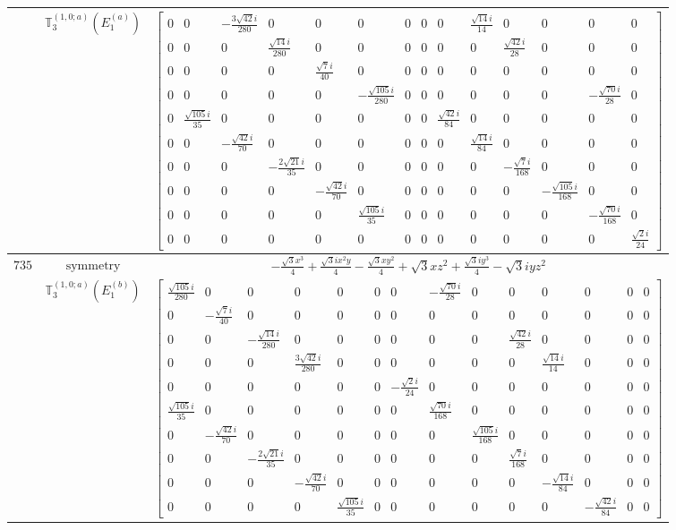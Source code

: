 \documentclass[fleqn,8pt,landscape]{jsarticle}
\begin{document}
\begin{longtable}{ccc}
$  $ & $ \mathbb{T}_{3}^{(1,0;a)}(E_{1}^{(a)}) $ & $ \begin{bmatrix} 0 & 0 & - \frac{3 \sqrt{42} i}{280} & 0 & 0 & 0 & 0 & 0 & 0 & \frac{\sqrt{14} i}{14} & 0 & 0 & 0 & 0 \\ 0 & 0 & 0 & \frac{\sqrt{14} i}{280} & 0 & 0 & 0 & 0 & 0 & 0 & \frac{\sqrt{42} i}{28} & 0 & 0 & 0 \\ 0 & 0 & 0 & 0 & \frac{\sqrt{7} i}{40} & 0 & 0 & 0 & 0 & 0 & 0 & 0 & 0 & 0 \\ 0 & 0 & 0 & 0 & 0 & - \frac{\sqrt{105} i}{280} & 0 & 0 & 0 & 0 & 0 & 0 & - \frac{\sqrt{70} i}{28} & 0 \\ 0 & \frac{\sqrt{105} i}{35} & 0 & 0 & 0 & 0 & 0 & 0 & \frac{\sqrt{42} i}{84} & 0 & 0 & 0 & 0 & 0 \\ 0 & 0 & - \frac{\sqrt{42} i}{70} & 0 & 0 & 0 & 0 & 0 & 0 & \frac{\sqrt{14} i}{84} & 0 & 0 & 0 & 0 \\ 0 & 0 & 0 & - \frac{2 \sqrt{21} i}{35} & 0 & 0 & 0 & 0 & 0 & 0 & - \frac{\sqrt{7} i}{168} & 0 & 0 & 0 \\ 0 & 0 & 0 & 0 & - \frac{\sqrt{42} i}{70} & 0 & 0 & 0 & 0 & 0 & 0 & - \frac{\sqrt{105} i}{168} & 0 & 0 \\ 0 & 0 & 0 & 0 & 0 & \frac{\sqrt{105} i}{35} & 0 & 0 & 0 & 0 & 0 & 0 & - \frac{\sqrt{70} i}{168} & 0 \\ 0 & 0 & 0 & 0 & 0 & 0 & 0 & 0 & 0 & 0 & 0 & 0 & 0 & \frac{\sqrt{2} i}{24} \end{bmatrix} $ \\ \hline
$ 735 $ & $ \text{symmetry} $ & $ - \frac{\sqrt{3} x^{3}}{4} + \frac{\sqrt{3} i x^{2} y}{4} - \frac{\sqrt{3} x y^{2}}{4} + \sqrt{3} x z^{2} + \frac{\sqrt{3} i y^{3}}{4} - \sqrt{3} i y z^{2} $ \\
$  $ & $ \mathbb{T}_{3}^{(1,0;a)}(E_{1}^{(b)}) $ & $ \begin{bmatrix} \frac{\sqrt{105} i}{280} & 0 & 0 & 0 & 0 & 0 & 0 & - \frac{\sqrt{70} i}{28} & 0 & 0 & 0 & 0 & 0 & 0 \\ 0 & - \frac{\sqrt{7} i}{40} & 0 & 0 & 0 & 0 & 0 & 0 & 0 & 0 & 0 & 0 & 0 & 0 \\ 0 & 0 & - \frac{\sqrt{14} i}{280} & 0 & 0 & 0 & 0 & 0 & 0 & \frac{\sqrt{42} i}{28} & 0 & 0 & 0 & 0 \\ 0 & 0 & 0 & \frac{3 \sqrt{42} i}{280} & 0 & 0 & 0 & 0 & 0 & 0 & \frac{\sqrt{14} i}{14} & 0 & 0 & 0 \\ 0 & 0 & 0 & 0 & 0 & 0 & - \frac{\sqrt{2} i}{24} & 0 & 0 & 0 & 0 & 0 & 0 & 0 \\ \frac{\sqrt{105} i}{35} & 0 & 0 & 0 & 0 & 0 & 0 & \frac{\sqrt{70} i}{168} & 0 & 0 & 0 & 0 & 0 & 0 \\ 0 & - \frac{\sqrt{42} i}{70} & 0 & 0 & 0 & 0 & 0 & 0 & \frac{\sqrt{105} i}{168} & 0 & 0 & 0 & 0 & 0 \\ 0 & 0 & - \frac{2 \sqrt{21} i}{35} & 0 & 0 & 0 & 0 & 0 & 0 & \frac{\sqrt{7} i}{168} & 0 & 0 & 0 & 0 \\ 0 & 0 & 0 & - \frac{\sqrt{42} i}{70} & 0 & 0 & 0 & 0 & 0 & 0 & - \frac{\sqrt{14} i}{84} & 0 & 0 & 0 \\ 0 & 0 & 0 & 0 & \frac{\sqrt{105} i}{35} & 0 & 0 & 0 & 0 & 0 & 0 & - \frac{\sqrt{42} i}{84} & 0 & 0 \end{bmatrix} $ \\ \hline

\end{longtable}
\end{document}
